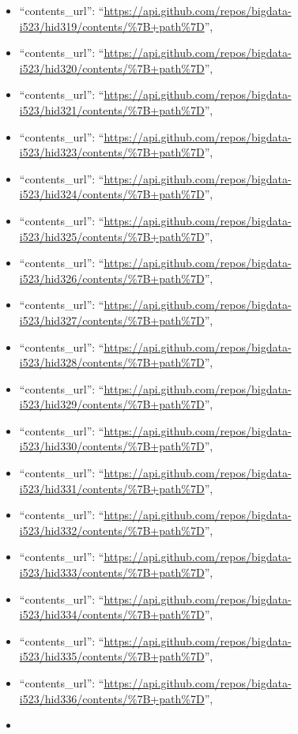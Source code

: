 \begin{itemize}
\item
  ``contents\_url'':
  ``\url{https://api.github.com/repos/bigdata-i523/hid319/contents/\%7B+path\%7D}'',
\item
  ``contents\_url'':
  ``\url{https://api.github.com/repos/bigdata-i523/hid320/contents/\%7B+path\%7D}'',
\item
  ``contents\_url'':
  ``\url{https://api.github.com/repos/bigdata-i523/hid321/contents/\%7B+path\%7D}'',
\item
  ``contents\_url'':
  ``\url{https://api.github.com/repos/bigdata-i523/hid323/contents/\%7B+path\%7D}'',
\item
  ``contents\_url'':
  ``\url{https://api.github.com/repos/bigdata-i523/hid324/contents/\%7B+path\%7D}'',
\item
  ``contents\_url'':
  ``\url{https://api.github.com/repos/bigdata-i523/hid325/contents/\%7B+path\%7D}'',
\item
  ``contents\_url'':
  ``\url{https://api.github.com/repos/bigdata-i523/hid326/contents/\%7B+path\%7D}'',
\item
  ``contents\_url'':
  ``\url{https://api.github.com/repos/bigdata-i523/hid327/contents/\%7B+path\%7D}'',
\item
  ``contents\_url'':
  ``\url{https://api.github.com/repos/bigdata-i523/hid328/contents/\%7B+path\%7D}'',
\item
  ``contents\_url'':
  ``\url{https://api.github.com/repos/bigdata-i523/hid329/contents/\%7B+path\%7D}'',
\item
  ``contents\_url'':
  ``\url{https://api.github.com/repos/bigdata-i523/hid330/contents/\%7B+path\%7D}'',
\item
  ``contents\_url'':
  ``\url{https://api.github.com/repos/bigdata-i523/hid331/contents/\%7B+path\%7D}'',
\item
  ``contents\_url'':
  ``\url{https://api.github.com/repos/bigdata-i523/hid332/contents/\%7B+path\%7D}'',
\item
  ``contents\_url'':
  ``\url{https://api.github.com/repos/bigdata-i523/hid333/contents/\%7B+path\%7D}'',
\item
  ``contents\_url'':
  ``\url{https://api.github.com/repos/bigdata-i523/hid334/contents/\%7B+path\%7D}'',
\item
  ``contents\_url'':
  ``\url{https://api.github.com/repos/bigdata-i523/hid335/contents/\%7B+path\%7D}'',
\item
  ``contents\_url'':
  ``\url{https://api.github.com/repos/bigdata-i523/hid336/contents/\%7B+path\%7D}'',
\item

\end{itemize}
